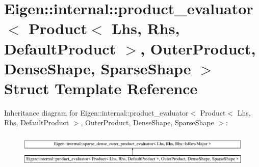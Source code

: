 \hypertarget{struct_eigen_1_1internal_1_1product__evaluator_3_01_product_3_01_lhs_00_01_rhs_00_01_default_pro2587512d8613ab7eaf4e89d5bc171599}{}\section{Eigen\+::internal\+::product\+\_\+evaluator$<$ Product$<$ Lhs, Rhs, Default\+Product $>$, Outer\+Product, Dense\+Shape, Sparse\+Shape $>$ Struct Template Reference}
\label{struct_eigen_1_1internal_1_1product__evaluator_3_01_product_3_01_lhs_00_01_rhs_00_01_default_pro2587512d8613ab7eaf4e89d5bc171599}
Inheritance diagram for Eigen\+::internal\+::product\+\_\+evaluator$<$ Product$<$ Lhs, Rhs, Default\+Product $>$, Outer\+Product, Dense\+Shape, Sparse\+Shape $>$\+:\begin{figure}[H]
\begin{center}
\leavevmode
\includegraphics[height=1.611511cm]{struct_eigen_1_1internal_1_1product__evaluator_3_01_product_3_01_lhs_00_01_rhs_00_01_default_pro2587512d8613ab7eaf4e89d5bc171599}
\end{center}
\end{figure}
